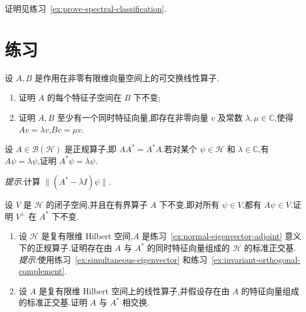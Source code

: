 {证明见练习~\ref{ex:prove-spectral-classification}.

\section{练习}
\label{sec:chapter7-exercises}

\begin{exercise}[同时特征向量]\label{ex:simultaneous-eigenvector}
设 \(A,B\) 是作用在非零有限维向量空间上的可交换线性算子.
\begin{enumerate}[label=(\alph*)]
\item 证明 \(A\) 的每个特征子空间在 \(B\) 下不变;
\item 证明 \(A,B\) 至少有一个同时特征向量,即存在非零向量 \(v\) 及常数 \(\lambda,\mu\in\mathbb{C}\),使得 \(Av=\lambda v\),\(Bv=\mu v\).
\end{enumerate}
\end{exercise}

\begin{exercise}[正规算子的特征向量]\label{ex:normal-eigenvector-adjoint}
设 \(A\in\mathcal{B}(\mathcal{H})\) 是正规算子,即 \(AA^{*}=A^{*}A\).若对某个 \(\psi\in\mathcal{H}\) 和 \(\lambda\in\mathbb{C}\),有 \(A\psi=\lambda\psi\),证明 \(A^{*}\psi=\overline{\lambda}\psi\).

\emph{提示:}计算 \(\|(A^{*}-\overline{\lambda}I)\psi\|\).
\end{exercise}

\begin{exercise}[不变子空间的正交补]\label{ex:invariant-orthogonal-complement}
设 \(V\) 是 \(\mathcal{H}\) 的闭子空间,并且在有界算子 \(A\) 下不变,即对所有 \(\psi\in V\),都有 \(A\psi\in V\).证明 \(V^{\perp}\) 在 \(A^{*}\) 下不变.
\end{exercise}

\begin{exercise}[有限维正规算子的标准正交基]\label{ex:finite-normal-orthonormal-basis}
\begin{enumerate}[label=(\alph*)]
\item 设 \(\mathcal{H}\) 是复有限维 Hilbert 空间,\(A\) 是练习~\ref{ex:normal-eigenvector-adjoint} 意义下的正规算子.证明存在由 \(A\) 与 \(A^{*}\) 的同时特征向量组成的 \(\mathcal{H}\) 的标准正交基.
\emph{提示:}使用练习~\ref{ex:simultaneous-eigenvector} 和练习~\ref{ex:invariant-orthogonal-complement}.
\item 设 \(A\) 是复有限维 Hilbert 空间上的线性算子,并假设存在由 \(A\) 的特征向量组成的标准正交基.证明 \(A\) 与 \(A^{*}\) 相交换.
\end{enumerate}
\end{exercise}

}
